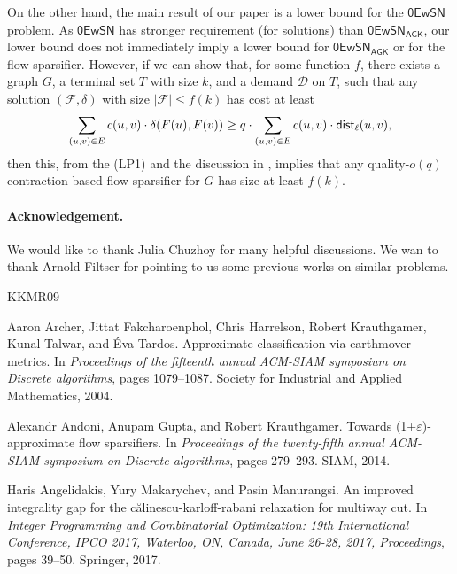 \documentclass[11pt]{article}
\theoremstyle{definition}
\newcommand{\dset}{{\mathcal{D}}}
\newcommand{\fset}{{\mathcal{F}}}
\newcommand{\dist}{\textnormal{\textsf{dist}}}
\newcommand{\zesn}{\mathsf{0EwSN}}
\begin{document}
\begin{titlepage}
On the other hand, the main result of our paper is a lower bound for the $\zesn$ problem. As $\zesn$ has stronger requirement (for solutions) than $\zesn_{\textsf{AGK}}$, our lower bound does not immediately imply a lower bound for $\zesn_{\textsf{AGK}}$ or for the flow sparsifier. However, if we can show that, for some function $f$, there exists a graph $G$, a terminal set $T$ with size $k$, and a demand $\dset$ on $T$, such that any solution $(\fset,\delta)$ with size $|\fset|\le f(k)$ has cost at least
\[\sum_{(u,v)\in E}c(u,v)\cdot\delta(F(u),F(v))\ge q\cdot \sum_{(u,v)\in E}c(u,v)\cdot\dist_{\ell}(u,v),\] 
then this, from the (LP1) and the discussion in \cite{andoni2014towards}, implies that any quality-$o(q)$ contraction-based flow sparsifier for $G$ has size at least $f(k)$.

\paragraph{Acknowledgement.} We would like to thank Julia Chuzhoy for many helpful discussions. We wan to thank Arnold Filtser for pointing to us some previous works on similar problems.


\newcommand{\etalchar}[1]{$^{#1}$}
\begin{thebibliography}{KKMR09}

\bibitem[AFH{\etalchar{+}}04]{archer2004approximate}
Aaron Archer, Jittat Fakcharoenphol, Chris Harrelson, Robert Krauthgamer, Kunal
  Talwar, and {\'E}va Tardos.
\newblock Approximate classification via earthmover metrics.
\newblock In {\em Proceedings of the fifteenth annual ACM-SIAM symposium on
  Discrete algorithms}, pages 1079--1087. Society for Industrial and Applied
  Mathematics, 2004.

Alexandr Andoni, Anupam Gupta, and Robert Krauthgamer.
\newblock Towards (1+{$\varepsilon$})-approximate flow sparsifiers.
\newblock In {\em Proceedings of the twenty-fifth annual ACM-SIAM symposium on
  Discrete algorithms}, pages 279--293. SIAM, 2014.

Haris Angelidakis, Yury Makarychev, and Pasin Manurangsi.
\newblock An improved integrality gap for the c{\u{a}}linescu-karloff-rabani
  relaxation for multiway cut.
\newblock In {\em Integer Programming and Combinatorial Optimization: 19th
  International Conference, IPCO 2017, Waterloo, ON, Canada, June 26-28, 2017,
  Proceedings}, pages 39--50. Springer, 2017.


\end{thebibliography}
\end{titlepage}
\end{document}
